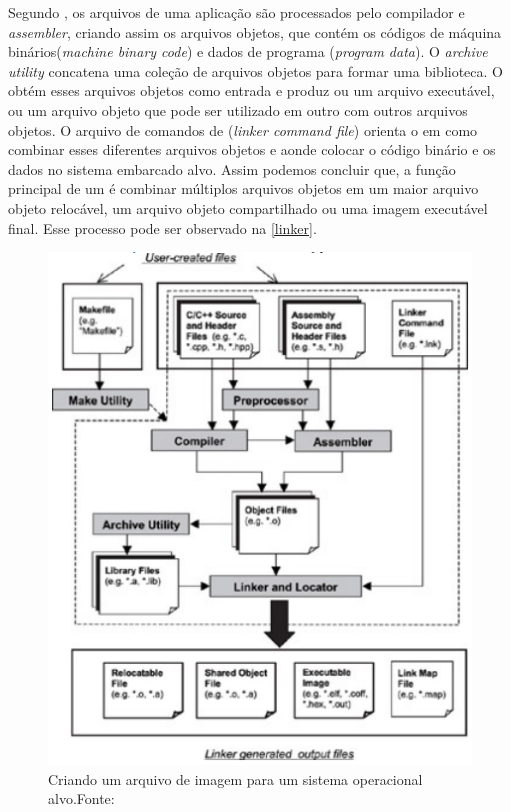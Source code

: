 Segundo , os arquivos de uma aplicação são processados pelo compilador e \textit{assembler}, criando assim os arquivos objetos, que contém os códigos de máquina binários(\textit{machine binary code}) e dados de programa (\textit{program data}). O \textit{archive utility} concatena uma coleção de arquivos objetos para formar uma biblioteca. O \linker obtém esses arquivos objetos como entrada e produz ou um arquivo executável, ou um arquivo objeto que pode ser utilizado em outro \linker com outros arquivos objetos. O arquivo de comandos de \linker (\textit{linker command file}) orienta o \linker em como combinar esses diferentes arquivos objetos e aonde colocar o código binário e os dados no sistema embarcado alvo. Assim podemos concluir que, a função principal de um \linker é combinar múltiplos arquivos objetos em um maior arquivo objeto relocável, um arquivo objeto compartilhado ou uma imagem executável final. Esse processo pode ser observado na \autoref{linker}.

\begin{figure}[H]
    \scriptsize
     \centering
     \includegraphics[scale=1]{dados/figuras/Linker.png}
     \caption{Criando um arquivo de imagem para um sistema operacional alvo.\newline Fonte:\cite{Qing2003}}
     \label{linker}
\end{figure}

